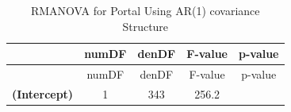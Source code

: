 \documentclass[]{article}
\begin{document}
\begin{longtable}[c]{@{}ccccc@{}}
\caption{RMANOVA for Portal Using AR(1) covariance
Structure}\tabularnewline
\toprule
\begin{minipage}[b]{0.25\columnwidth}\centering\strut
~
\strut\end{minipage} &
\begin{minipage}[b]{0.10\columnwidth}\centering\strut
numDF
\strut\end{minipage} &
\begin{minipage}[b]{0.10\columnwidth}\centering\strut
denDF
\strut\end{minipage} &
\begin{minipage}[b]{0.12\columnwidth}\centering\strut
F-value
\strut\end{minipage} &
\begin{minipage}[b]{0.12\columnwidth}\centering\strut
p-value
\strut\end{minipage}\tabularnewline
\midrule
\endfirsthead
\toprule
\begin{minipage}[b]{0.25\columnwidth}\centering\strut
~
\strut\end{minipage} &
\begin{minipage}[b]{0.10\columnwidth}\centering\strut
numDF
\strut\end{minipage} &
\begin{minipage}[b]{0.10\columnwidth}\centering\strut
denDF
\strut\end{minipage} &
\begin{minipage}[b]{0.12\columnwidth}\centering\strut
F-value
\strut\end{minipage} &
\begin{minipage}[b]{0.12\columnwidth}\centering\strut
p-value
\strut\end{minipage}\tabularnewline
\midrule
\endhead
\begin{minipage}[t]{0.25\columnwidth}\centering\strut
\textbf{(Intercept)}
\strut\end{minipage} &
\begin{minipage}[t]{0.10\columnwidth}\centering\strut
1
\strut\end{minipage} &
\begin{minipage}[t]{0.10\columnwidth}\centering\strut
343
\strut\end{minipage} &
\begin{minipage}[t]{0.12\columnwidth}\centering\strut
256.2
\strut\end{minipage} &
\begin{minipage}[t]{0.12\columnwidth}\centering\strut

\end{minipage}
\end{longtable}
\end{document}
